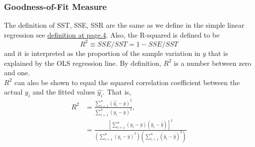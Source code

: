 \documentclass[a4paper, 10pt]{article}
\theoremstyle{definition}	%
\begin{document}
\subsubsection{Goodness-of-Fit Measure}
The definition of SST, SSE, SSR are the same as we define in the simple linear regression see \hyperref[def:SST,SSE,SSR]{definition at page.4}. Also, the R-squared is defined to be
\begin{equation}
    R^2 \equiv SSE/SST = 1 - SSE/SST
\end{equation}
and it is interpreted as the proportion of the sample variation in $y$ that is explained by the OLS regression line. By definition, $R^2$ is a number between zero and one.\\
$R^2$ can also be shown to equal the squared correlation coefficient between the actual $y_i$ and the fitted values $\hat{y_i}$. That is,
\begin{align}
    R^2 &= \frac{\sum_{i=1}^{n}(\hat{y_i}-\bar{y})^2}{\sum_{i=1}^{n}(y_i-\bar{y})^2}, \label{eq:p77,3.29-1}\\
    &= \frac{\left[ \sum_{i=1}^{n} (y_i - \bar{y})(\hat{y}_i - \bar{\hat{y}}) \right]^2}{\left( \sum_{i=1}^{n} (y_i - \bar{y})^2 \right) \left( \sum_{i=1}^{n} (\hat{y}_i - \bar{\hat{y}})^2 \right)} \label{eq:p77,3.29-2}
\end{align}
\end{document}
